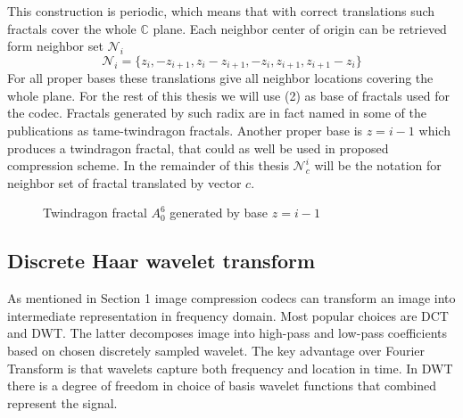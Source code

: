 This construction is periodic, which means that with correct translations such fractals cover the whole $\mathbb{C}$ plane.
Each neighbor center of origin can be retrieved form neighbor set $\mathcal{N}_i$
\begin{equation*}
    \mathcal{N}_{i} = \{ z_i, -z_{i+1},z_i-z_{i+1}, -z_i, z_{i+1}, z_{i+1} - z_i \} 
\end{equation*}
For all proper bases these translations give all neighbor locations covering the whole plane. For the rest of this thesis we will use 
(2) as base of fractals used for the codec. Fractals generated by such radix are in fact named in some of the publications as tame-twindragon fractals.
Another proper base is $z = i - 1$ which produces a twindragon fractal, that could as well be used in proposed compression scheme. In
the remainder of this thesis $\mathcal{N}^i_c$ will be the notation for neighbor set of fractal translated by vector $c$.
\begin{figure}[ht]
    \centering
    \caption{Twindragon fractal $A^6_0$ generated by base $z=i-1$} 
\end{figure}
\newpage
\subsection{Discrete Haar wavelet transform}
As mentioned in Section 1 image compression codecs can transform an image
into intermediate representation in frequency domain. Most popular
choices are DCT and DWT. The latter decomposes image into high-pass and low-pass coefficients
based on chosen discretely sampled wavelet. The key advantage over Fourier Transform is that wavelets capture
both frequency and location in time. In DWT there is a degree of freedom in choice of basis wavelet functions that combined represent the signal.

